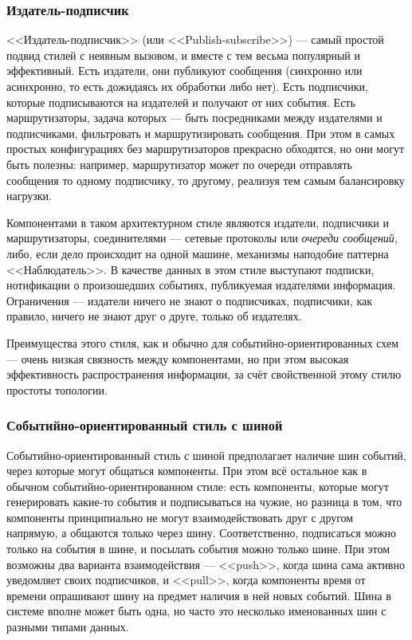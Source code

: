 \documentclass{../../text-style}
\begin{document}
\subsubsection{Издатель-подписчик}

<<Издатель-подписчик>> (или <<Publish-subscribe>>) --- самый простой подвид стилей с неявным вызовом, и вместе с тем весьма популярный и эффективный. Есть издатели, они публикуют сообщения (синхронно или асинхронно, то есть дожидаясь их обработки либо нет). Есть подписчики, которые подписываются на издателей и получают от них события. Есть маршрутизаторы, задача которых --- быть посредниками между издателями и подписчиками, фильтровать и маршрутизировать сообщения. При этом в самых простых конфигурациях без маршрутизаторов прекрасно обходятся, но они могут быть полезны: например, маршрутизатор может по очереди отправлять сообщения то одному подписчику, то другому, реализуя тем самым балансировку нагрузки.

Компонентами в таком архитектурном стиле являются издатели, подписчики и маршрутизаторы, соединителями --- сетевые протоколы или \textit{очереди сообщений}, либо, если дело происходит на одной машине, механизмы наподобие паттерна <<Наблюдатель>>. В качестве данных в этом стиле выступают подписки, нотификации о произошедших событиях, публикуемая издателями информация. Ограничения --- издатели ничего не знают о подписчиках, подписчики, как правило, ничего не знают друг о друге, только об издателях.

Преимущества этого стиля, как и обычно для событийно-ориентированных схем --- очень низкая связность между компонентами, но при этом высокая эффективность распространения информации, за счёт свойственной этому стилю простоты топологии.

\subsubsection{Событийно-ориентированный стиль с шиной}

Событийно-ориентированный стиль с шиной предполагает наличие шин событий, через которые могут общаться компоненты. При этом всё остальное как в обычном событийно-ориентированном стиле: есть компоненты, которые могут генерировать какие-то события и подписываться на чужие, но разница в том, что компоненты принципиально не могут взаимодействовать друг с другом напрямую, а общаются только через шину. Соответственно, подписаться можно только на события в шине, и посылать события можно только шине. При этом возможны два варианта взаимодействия --- <<push>>, когда шина сама активно уведомляет своих подписчиков, и <<pull>>, когда компоненты время от времени опрашивают шину на предмет наличия в ней новых событий. Шина в системе вполне может быть одна, но часто это несколько именованных шин с разными типами данных.
\end{document}
